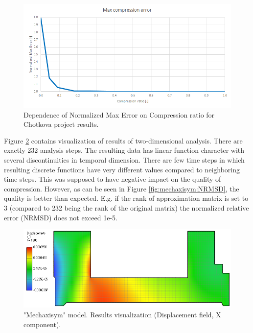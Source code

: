 \begin{figure}[H]
\centering\includegraphics[width=\textwidth]{figures/chotkova_MaxError}
\caption{Dependence of Normalized Max Error on Compression ratio for Chotkova project results.}
\label{fig:chotkova:MaxError}
\end{figure}

Figure \ref{fig:mechaxisym:mesh} contains visualization of results of two-dimensional analysis. There are exactly 232 analysis steps. The resulting data has linear function character with several discontinuities in temporal dimension. There are few time steps in which resulting discrete functions have very different values compared to neighboring time steps. This was supposed to have negative impact on the quality of compression. However, as can be seen in Figure \ref{fig:mechaxisym:NRMSD}, the quality is better than expected. E.g. if the rank of approximation matrix is set to 3 (compared to 232 being the rank of the original matrix) the normalized relative error (NRMSD) does not exceed 1e-5.

\begin{figure}[H]
\centering\includegraphics[width=\textwidth]{figures/mechaxisym_screenshot}
\caption{"Mechaxisym" model. Results visualization (Displacement field, X component).}
\label{fig:mechaxisym:mesh}
\end{figure}

